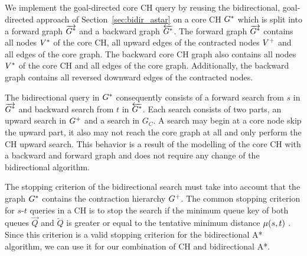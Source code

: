 We implement the goal-directed core CH query by reusing the bidirectional, goal-directed approach of Section~\ref{sec:bidir_astar} on a core CH $G^*$ which is split into a forward graph $\overrightarrow{G^*}$ and a backward graph $\overleftarrow{G^*}$. The forward graph $\overrightarrow{G^*}$ contains all nodes $V^*$ of the core CH, all upward edges of the contracted nodes $V^+$ and all edges of the core graph. The backward core CH graph also contains all nodes $V^*$ of the core CH and all edges of the core graph. Additionally, the backward graph contains all reversed downward edges of the contracted nodes.

The bidirectional query in $G^*$ consequently consists of a forward search from $s$ in $\overrightarrow{G^*}$ and backward search from $t$ in $\overleftarrow{G^*}$. Each search consists of two parts, an upward search in $G^+$ and a search in $G_C$. A search may begin at a core node skip the upward part, it also may not reach the core graph at all and only perform the CH upward search. This behavior is a result of the modelling of the core CH with a backward and forward graph and does not require any change of the bidirectional algorithm.

The stopping criterion of the bidirectional search must take into account that the graph $G^*$ contains the contraction hierarchy $G^+$. The common stopping criterion for $s$-$t$ queries in a CH is to stop the search if the minimum queue key of both queues $\overrightarrow{Q}$ and $\overleftarrow{Q}$ is greater or equal to the tentative minimum distance $\mu(s,t)$ \cite{geisberger:2012}. Since this criterion is a valid stopping criterion for the bidirectional A* algorithm, we can use it for our combination of CH and bidirectional A*.

